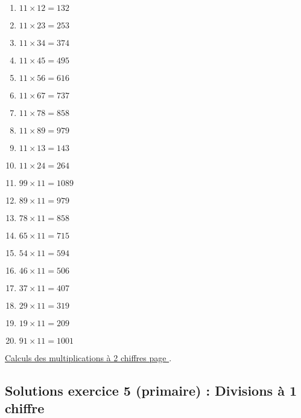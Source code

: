 \begin{enumerate}[label=S\arabic*)]
    \item \(11\times 12 =  132 \)
    \item \(11\times 23 = 253 \)
    \item \(11\times 34 = 374 \)
    \item \(11\times 45 = 495 \)
    \item \(11\times 56 = 616 \)
    \item \(11\times 67 = 737 \)
    \item \(11\times 78 =  858 \)
    \item \(11\times 89 = 979 \)
    \item \(11\times 13 = 143 \)
    \item \(11\times 24 = 264 \)
    \item \(99\times 11 = 1089\)
    \item \(89\times 11 = 979\)
    \item \(78\times 11 = 858\)
    \item \(65\times 11 = 715\)
    \item \(54\times 11 = 594\)
    \item \(46\times 11 = 506\)
    \item \(37\times 11 = 407\)
    \item \(29\times 11 = 319\)
    \item \(19\times 11 = 209\)
    \item \(91\times 11 = 1001\)
\end{enumerate}


\hyperref[calc:niveau4]{Calculs des multiplications à 2 chiffres page \pageref{calc:niveau4}}.


\newpage 


\subsection{Solutions exercice 5 (primaire) : Divisions à 1 chiffre}

\label{sol:niveau5}

